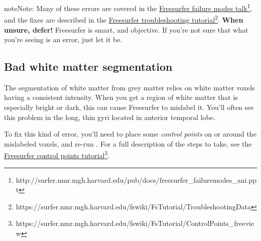 \documentclass[letterpaper,10pt,openany,oneside]{sphinxmanual}
\begin{document}
\begin{notice}{note}{Note:}
Many of these errors are covered in the \href{http://surfer.nmr.mgh.harvard.edu/pub/docs/freesurfer\_failuremodes\_ani.ppt}{Freesurfer failure modes
talk}\footnote{http://surfer.nmr.mgh.harvard.edu/pub/docs/freesurfer\_failuremodes\_ani.ppt},
and the fixes are described in the \href{https://surfer.nmr.mgh.harvard.edu/fswiki/FsTutorial/TroubleshootingData}{Freesurfer troubleshooting tutorial}\footnote{https://surfer.nmr.mgh.harvard.edu/fswiki/FsTutorial/TroubleshootingData}.
\textbf{When unsure, defer!} Freesurfer is smart, and objective. If you're
not sure that what you're seeing is an error, just let it be.
\end{notice}


\subsection{Bad white matter segmentation}
\label{surface_reconstruction:bad-white-matter-segmentation}
The segmentation of white matter from grey matter relies on white matter voxels
having a consistent intensity. When you get a region of white matter that is
especially bright or dark, this can cause Freesurfer to mislabel it. You'll
often see this problem in the long, thin gyri located in anterior temporal
lobe.

To fix this kind of error, you'll need to place some \emph{control points} on or
around the mislabeled voxels, and re-run . For a full description
of the steps to take, see the \href{https://surfer.nmr.mgh.harvard.edu/fswiki/FsTutorial/ControlPoints\_freeview}{Freesurfer control points tutorial}\footnote{https://surfer.nmr.mgh.harvard.edu/fswiki/FsTutorial/ControlPoints\_freeview}.
\end{document}
